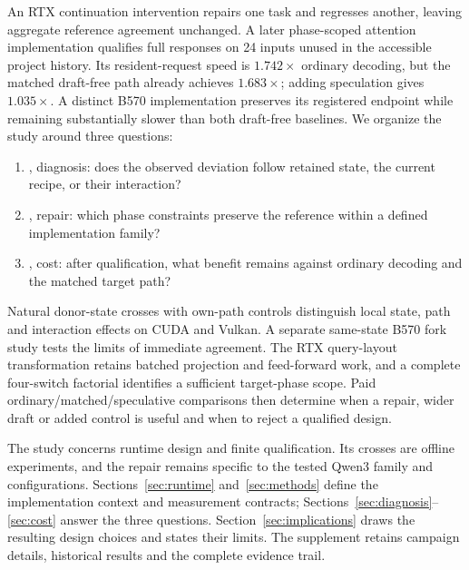 An RTX continuation intervention repairs one task and regresses another, leaving aggregate reference agreement unchanged. A later phase-scoped attention implementation qualifies full responses on 24 inputs unused in the accessible project history. Its resident-request speed is $1.742\times$ ordinary decoding, but the matched draft-free path already achieves $1.683\times$; adding speculation gives $1.035\times$. A distinct B570 implementation preserves its registered endpoint while remaining substantially slower than both draft-free baselines. We organize the study around three questions:
\begin{enumerate}
\item {}, diagnosis: does the observed deviation follow retained state, the current recipe, or their interaction?
\item {}, repair: which phase constraints preserve the reference within a defined implementation family?
\item {}, cost: after qualification, what benefit remains against ordinary decoding and the matched target path?
\end{enumerate}

Natural donor-state crosses with own-path controls distinguish local state, path and interaction effects on CUDA and Vulkan. A separate same-state B570 fork study tests the limits of immediate agreement. The RTX query-layout transformation retains batched projection and feed-forward work, and a complete four-switch factorial identifies a sufficient target-phase scope. Paid ordinary/matched/speculative comparisons then determine when a repair, wider draft or added control is useful and when to reject a qualified design.

The study concerns runtime design and finite qualification. Its crosses are offline experiments, and the repair remains specific to the tested Qwen3 family and configurations. Sections~\ref{sec:runtime} and~\ref{sec:methods} define the implementation context and measurement contracts; Sections~\ref{sec:diagnosis}--\ref{sec:cost} answer the three questions. Section~\ref{sec:implications} draws the resulting design choices and states their limits. The supplement retains campaign details, historical results and the complete evidence trail.
